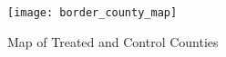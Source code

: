 \begin{figure}[H]
    \centering
    \texttt{[image: border\_county\_map]}
    \caption{Map of Treated and Control Counties}
    \label{fig:border-county-map}
\end{figure}